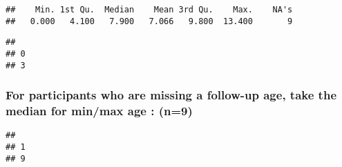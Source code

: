 \documentclass[
]{article}
\newenvironment{Shaded}{\begin{snugshade}}{\end{snugshade}}
\newcommand{\AlertTok}[1]{\textcolor[rgb]{0.94,0.16,0.16}{#1}}
\newcommand{\CommentTok}[1]{\textcolor[rgb]{0.56,0.35,0.01}{\textit{#1}}}
\newcommand{\KeywordTok}[1]{\textcolor[rgb]{0.13,0.29,0.53}{\textbf{#1}}}
\newcommand{\NormalTok}[1]{#1}
\newcommand{\OperatorTok}[1]{\textcolor[rgb]{0.81,0.36,0.00}{\textbf{#1}}}
\newcommand{\StringTok}[1]{\textcolor[rgb]{0.31,0.60,0.02}{#1}}
\begin{document}
\begin{verbatim}
##    Min. 1st Qu.  Median    Mean 3rd Qu.    Max.    NA's 
##   0.000   4.100   7.900   7.066   9.800  13.400       9
\end{verbatim}

\begin{Shaded}
\end{Shaded}

\begin{verbatim}
## 
## 0 
## 3
\end{verbatim}

\hypertarget{for-participants-who-are-missing-a-follow-up-age-take-the-median-for-minmax-age-n9}{%
\subsubsection{For participants who are missing a follow-up age, take
the median for min/max age :
(n=9)}\label{for-participants-who-are-missing-a-follow-up-age-take-the-median-for-minmax-age-n9}}

\begin{Shaded}
\end{Shaded}

\begin{verbatim}
## 
## 1 
## 9
\end{verbatim}

\begin{Shaded}
\end{Shaded}
\end{document}
